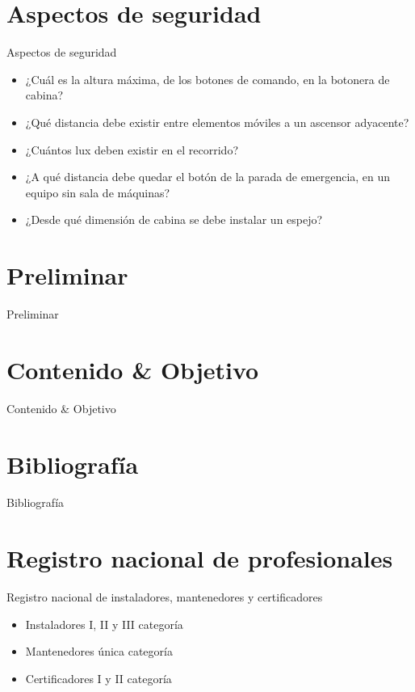 \section{Aspectos de seguridad}
\begin{frame}{Aspectos de seguridad}
	\begin{itemize}
		\item ¿Cuál es la altura máxima, de los botones de comando, en la botonera de cabina?
		\item ¿Qué distancia debe existir entre elementos móviles a un ascensor adyacente?
		\item ¿Cuántos lux deben existir en el recorrido?
		\item ¿A qué distancia debe quedar el botón de la parada de emergencia, en un equipo sin sala de máquinas?
		\item ¿Desde qué dimensión de cabina se debe instalar un espejo?
	\end{itemize}
\end{frame}

\section{Preliminar}
\begin{frame}{Preliminar}
\end{frame}

\section{Contenido \& Objetivo}
\begin{frame}{Contenido \& Objetivo}
\end{frame}

\section{Bibliografía}
\begin{frame}{Bibliografía}
\end{frame}

\section{Registro nacional de profesionales}
\begin{frame}{Registro nacional de instaladores, mantenedores y certificadores}
	\begin{itemize}
		\item Instaladores I, II y III categoría
		\item Mantenedores única categoría
		\item Certificadores I y II categoría
	\end{itemize}
\end{frame}

